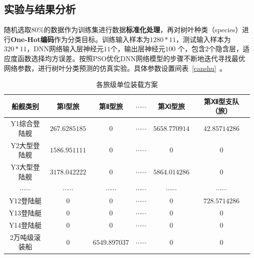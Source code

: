 \documentclass{whutmod}
\begin{document}
	\subsection{实验与结果分析}
	随机选取80\%的数据作为训练集进行数据\textbf{标准化处理}，再对树叶种类（species）进行\textbf{One-Hot编码}作为分类目标。训练输入样本为$1280*11$，测试输入样本为$320*11$，DNN网络输入层神经元$11$个，输出层神经元$100$ 个，包含$2$个隐含层，适应度函数选择均方误差。按照PSO优化DNN网络模型的步骤不断地迭代寻找最优网络参数，进行树叶分类预测的仿真实验。具体参数设置间表~\ref{canshu}~。
			\begin{table}[H]
		\centering		\caption{各旅级单位装载方案}\label{zhuangzai}
		\begin{tabular}{cccccc}
			\toprule[2pt]
			\multicolumn{1}{m{3cm}}{\centering 船舰类别}
			& \multicolumn{1}{m{2cm}}{\centering 第Ⅰ型旅}
			&\multicolumn{1}{m{2cm}}{\centering 第Ⅱ型旅}
			& \multicolumn{1}{m{3cm}}{\centering $ \cdots \cdots  $}
			& \multicolumn{1}{m{2cm}}{\centering 第Ⅺ型旅}
			& \multicolumn{1}{m{2cm}}{\centering 第Ⅻ型支队（旅）}
			\\
			\midrule[1pt]
			Y1综合登陆舰 &  $267.6285185$  &$0$ & $\cdots \cdots$&$5658.770914
			$ &$42.85714286$ \\ 
			Y2大型登陆舰	 &  $1586.951111$&$0$& $\cdots \cdots$ &$0$ &$0$\\ 
			Y3大型登陆舰	 &  $3178.042222 $ &$0$& $\cdots \cdots$ &$5864.014286
			$ &$0$\\ 
			$\cdots \cdots$	 &  $\cdots \cdots$  &$\cdots \cdots$ &$\cdots \cdots$ &$\cdots \cdots$ &$\cdots \cdots$\\ 
			Y12登陆艇	 &  $0$ &$0$ & $\cdots \cdots$ &$0$ &$728.5714286$\\ 
			Y13登陆艇	 &  $0$ &$0$ & $\cdots \cdots$ &$0$ &$0$\\ 
			Y14登陆艇		 &  $0$ &$0$ & $\cdots \cdots$ &$0$ &$0$\\ 
			2万吨级滚装船  &  $0 $ &$6549.897037$& $\cdots \cdots$ &$0$ &$0$ \\ 
			\bottomrule[2pt]	
		\end{tabular}

	\end{table}
	
\end{document}
